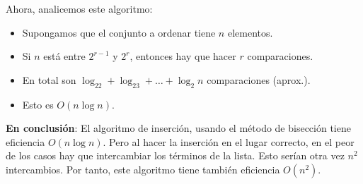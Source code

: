 Ahora, analicemos este algoritmo:

\begin{itemize}
    \item Supongamos que el conjunto a ordenar tiene $n$ elementos.
    \item Si $n$ está entre $2^{r-1}$ y $2^r$, entonces hay que hacer $r$ comparaciones.
    \item En total son $\log_22 + \log_23 + \dots + \log_2 n$ comparaciones (aprox.).
    \item Esto es $O(n\log n)$.
\end{itemize}

\textbf{En conclusión}: El algoritmo de inserción, usando el método de bisección tiene eficiencia $O(n \log n)$. Pero al hacer la inserción en el lugar correcto, en el peor de los casos hay que intercambiar los términos de la lista. Esto serían otra vez $n^2$ intercambios. Por tanto, este algoritmo tiene también eficiencia $O(n^2)$.
